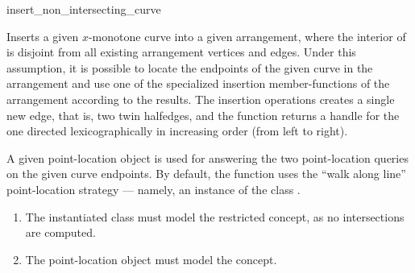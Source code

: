 \ccRefPageBegin

\begin{ccRefFunction}{insert_non_intersecting_curve}

\ccDefinition

Inserts a given $x$-monotone curve into a given arrangement, where the
interior of  is disjoint from all existing arrangement vertices
and edges. Under this assumption, it is possible to locate the endpoints
of the given curve in the arrangement and use one of the specialized
insertion member-functions of the arrangement according to the results.
The insertion operations creates a single new edge, that is, two twin
halfedges, and the function returns a handle for the one directed
lexicographically in increasing order (from left to right).

A given point-location object is used for answering the two point-location
queries on the given curve endpoints. By default, the function uses the
``walk along line'' point-location strategy --- namely, an instance of the
class .



\begin{enumerate}
\item The instantiated  class must model the restricted
 concept, as no intersections are computed.
\item The point-location object  must model the
 concept. 
\end{enumerate}

\end{ccRefFunction}

\ccRefPageEnd
